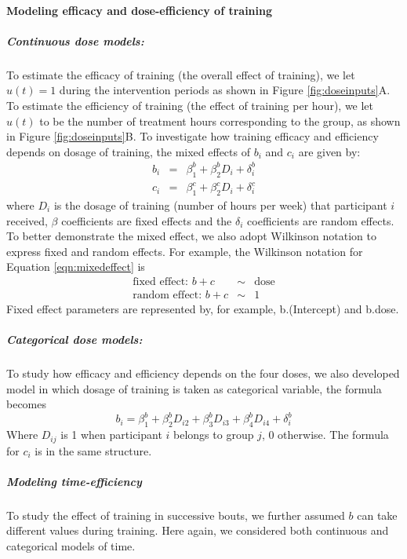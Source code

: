 \paragraph{Modeling efficacy and dose-efficiency of training}
\subparagraph{Continuous dose models: } 
To estimate the efficacy of training (the overall effect of training), we let $ u(t)=1 $ during the intervention periods as shown in Figure \ref{fig:doseinputs}A. 
To estimate the efficiency of training (the effect of training per hour), we let $ u(t) $ to be the number of treatment hours corresponding to the group, as shown in Figure  \ref{fig:doseinputs}B.  
To investigate how training efficacy and efficiency depends on dosage of training, the mixed effects of $ b_i $ and $ c_i $ are given by:
\begin{eqnarray}\label{eqn:mixedeffect}
	b_i &=& \beta_1^b + \beta_2^b D_i + \delta_i^b   \nonumber \\
	c_i &=& \beta_1^c + \beta_2^c D_i + \delta_i^c   
\end{eqnarray}
where $ D_i $ is the dosage of training (number of hours per week) that participant $ i $ received, 
$ \beta $ coefficients are fixed effects and the $ \delta_i $ coefficients are random effects. 
To better demonstrate the mixed effect, we also adopt Wilkinson notation to express fixed and random effects. 
For example, the Wilkinson notation for Equation \ref{eqn:mixedeffect} is
\begin{eqnarray}
	\text{fixed effect: } b + c  &\sim& \text{dose} \\
	\text{random effect: } b + c &\sim& 1
\end{eqnarray}
Fixed effect parameters are represented by, for example, b.(Intercept) and b.dose.

\subparagraph{Categorical dose models: } 
To study how efficacy and efficiency depends on the four doses, we also developed model in which dosage of training is taken as categorical variable, the formula becomes
\begin{equation}
	b_i = \beta_1^b + \beta_2^b D_{i2} + \beta_3^b D_{i3} + \beta_4^b D_{i4} + \delta_i^b
\end{equation}
Where $ D_{ij} $ is 1 when participant $ i $ belongs to group $ j $, 0 otherwise. 
The formula for $ c_i $ is in the same structure.

\subparagraph{Modeling time-efficiency}
To study the effect of training in successive bouts, we further assumed $ b $ can take different values during training. 
Here again, we considered both continuous and categorical models of time.

